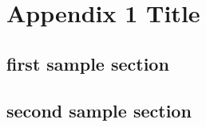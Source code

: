 \chapter{Appendix 1 Title}

\blindtext

\section{first sample section}

\blindtext

\section{second sample section}

\blindtext
